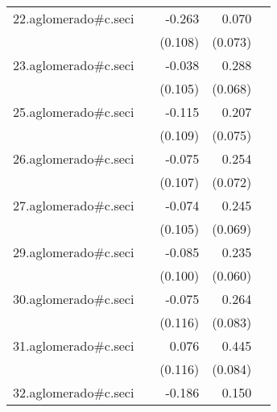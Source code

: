 {\begin{longtable}{l*{4}{D{.}{.}{-1}}}
\addlinespace
22.aglomerado#c.seci&                     &      -0.263\sym{*}  &       0.070         &                     \\
            &                     &     (0.108)         &     (0.073)         &                     \\
\addlinespace
23.aglomerado#c.seci&                     &      -0.038         &       0.288\sym{***}&                     \\
            &                     &     (0.105)         &     (0.068)         &                     \\
\addlinespace
25.aglomerado#c.seci&                     &      -0.115         &       0.207\sym{**} &                     \\
            &                     &     (0.109)         &     (0.075)         &                     \\
\addlinespace
26.aglomerado#c.seci&                     &      -0.075         &       0.254\sym{***}&                     \\
            &                     &     (0.107)         &     (0.072)         &                     \\
\addlinespace
27.aglomerado#c.seci&                     &      -0.074         &       0.245\sym{***}&                     \\
            &                     &     (0.105)         &     (0.069)         &                     \\
\addlinespace
29.aglomerado#c.seci&                     &      -0.085         &       0.235\sym{***}&                     \\
            &                     &     (0.100)         &     (0.060)         &                     \\
\addlinespace
30.aglomerado#c.seci&                     &      -0.075         &       0.264\sym{**} &                     \\
            &                     &     (0.116)         &     (0.083)         &                     \\
\addlinespace
31.aglomerado#c.seci&                     &       0.076         &       0.445\sym{***}&                     \\
            &                     &     (0.116)         &     (0.084)         &                     \\
\addlinespace
32.aglomerado#c.seci&                     &      -0.186         &       0.150         &                     \\

\end{longtable}}
